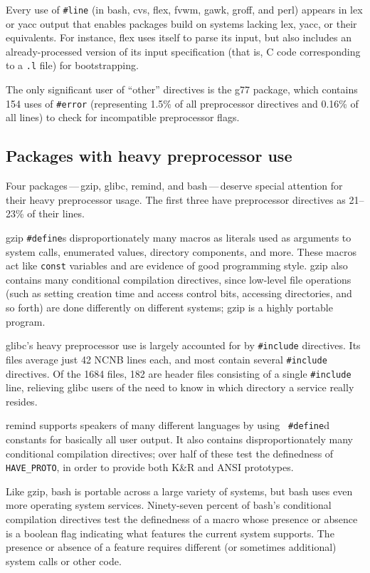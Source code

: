 \documentclass[11pt]{article}
\begin{document}
Every use of {\tt \#line} (in bash, cvs, flex, fvwm, gawk, groff, and perl)
appears in lex or yacc output that enables packages build on systems
lacking lex, yacc, or their equivalents.  For instance, flex uses itself to
parse its input, but also includes an already-processed version of its
input specification (that is, C code corresponding to a {\tt .l} file) for
bootstrapping.

The only significant user of ``other'' directives is the g77 package, which
contains 154 uses of {\tt \#error} (representing 1.5\% of all preprocessor
directives and 0.16\% of all lines) to check for incompatible preprocessor
flags.


\subsection{Packages with heavy preprocessor use}

Four packages\,---\,gzip, glibc, remind, and bash\,---\,deserve special
attention for their heavy preprocessor usage.  The first three have
preprocessor directives as 21--23\% of their lines.

gzip {\tt \#define}s disproportionately many macros as literals used as
arguments to system calls, enumerated values, directory components, and
more.  These macros act like {\tt const} variables and are evidence of good
programming style.  gzip also contains many conditional compilation
directives, since low-level file operations (such as setting creation time
and access control bits, accessing directories, and so forth) are done
differently on different systems; gzip is a highly portable program.

glibc's heavy preprocessor use is largely accounted for by {\tt \#include}
directives.  Its files average just 42 NCNB lines each, and most contain
several {\tt \#include} directives.  Of the 1684 files, 182 are header
files consisting of a single {\tt \#include} line, relieving glibc users of
the need to know in which directory a service really resides.

remind supports speakers of many different languages by using {\tt
\#define}d constants for basically all user output.  It also contains
disproportionately many conditional compilation directives; over half of
these test the definedness of \verb|HAVE_PROTO|, in order to provide both
K\&R and ANSI prototypes.

Like gzip, bash is portable across a large variety of systems, but bash
uses even more operating system services.  Ninety-seven percent of bash's
conditional compilation directives test the definedness of a macro whose
presence or absence is a boolean flag indicating what features the current
system supports.  The presence or absence of a feature requires different
(or sometimes additional) system calls or other code.
\end{document}
